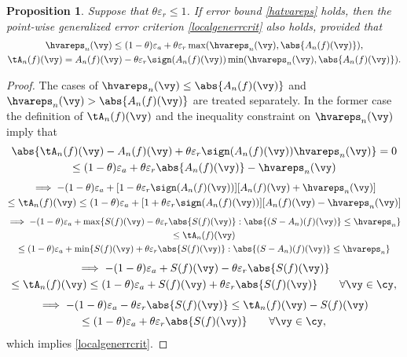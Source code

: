 \documentclass[]{elsarticle}
\newtheorem{prop}[theorem]{Proposition}
\theoremstyle{definition}
\theoremstyle{remark}
\begin{document}
\begin{prop} Suppose that $\theta \varepsilon_r \le 1$.  If error bound \eqref{hatvareps} holds, then the point-wise generalized error criterion \eqref{localgenerrcrit} also holds, provided that
\begin{gather*}
\hvareps_n(\vy) \le (1-\theta) \varepsilon_a + \theta \varepsilon_r \max(\hvareps_n(\vy), \abs{A_n(f)(\vy)}), \\
\tA_n(f)(\vy) = A_n(f)(\vy) - \theta \varepsilon_r \sign(A_n(f)(\vy)) \min(\hvareps_n(\vy), \abs{A_n(f)(\vy)}).
\end{gather*}
\end{prop}
\begin{proof}  The cases of $\hvareps_n(\vy) \le \abs{A_n(f)(\vy)}$ and $\hvareps_n(\vy) > \abs{A_n(f)(\vy)}$ are treated separately.  
In the former case the definition of $\tA_n(f)(\vy)$ and the inequality constraint on $\hvareps_n(\vy)$ imply that
\begin{multline*}
\abs{\tA_n(f)(\vy) - A_n(f)(\vy) + \theta \varepsilon_r \sign(A_n(f)(\vy)) \hvareps_n(\vy)}= 0  \\ \le (1-\theta)\varepsilon_a  + \theta \varepsilon_r\abs{A_n(f)(\vy)} - \hvareps_n(\vy)
\end{multline*}
\begin{multline*}
\implies -(1-\theta)\varepsilon_a + [1 - \theta \varepsilon_r\sign(A_n(f)(\vy))] [A_n(f)(\vy) + \hvareps_n(\vy)] \\
\le  \tA_n(f)(\vy) \le (1-\theta)\varepsilon_a + [1 + \theta \varepsilon_r\sign(A_n(f)(\vy))] [A_n(f)(\vy) - \hvareps_n(\vy)]
\end{multline*}
\begin{multline*}
\implies -(1-\theta)\varepsilon_a + \max\{S(f)(\vy) - \theta \varepsilon_r\abs{S(f)(\vy)} : \abs{(S-A_n)(f) (\vy)} \le \hvareps_n\} \\
\le  \tA_n(f)(\vy) \\
 \le (1-\theta)\varepsilon_a + \min\{S(f)(\vy) + \theta \varepsilon_r\abs{S(f)(\vy)} : \abs{(S-A_n)(f) (\vy)} \le \hvareps_n\}
\end{multline*}
\begin{multline*}
\implies -(1-\theta)\varepsilon_a + S(f)(\vy) - \theta \varepsilon_r\abs{S(f)(\vy)} \\
\le  \tA_n(f)(\vy)
 \le (1-\theta)\varepsilon_a + S(f)(\vy) + \theta \varepsilon_r\abs{S(f)(\vy)}  \qquad \forall \vy \in \cy,
\end{multline*}
\begin{multline*}
\implies -(1-\theta)\varepsilon_a - \theta \varepsilon_r\abs{S(f)(\vy)}
\le  \tA_n(f)(\vy) - S(f)(\vy) \\
 \le (1-\theta)\varepsilon_a + \theta \varepsilon_r\abs{S(f)(\vy)}  \qquad \forall \vy \in \cy,
\end{multline*}
which implies \eqref{localgenerrcrit}.


\end{proof}
\end{document}
